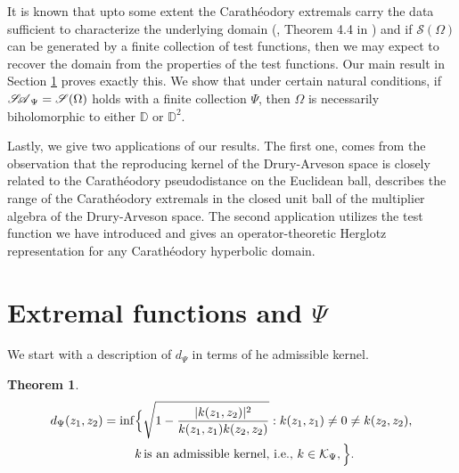 \documentclass[12pt]{amsart}
\newtheorem{theorem}{Theorem}[section]
\theoremstyle{definition}
\numberwithin{equation}{section}
\newcommand{\D}{\mathbb{D}}
\newcommand{\SA}{\mathscr{S\mspace{-5mu}A}}
\begin{document}
It is known that upto some extent the Carath\'eodory extremals carry the data sufficient to characterize the underlying domain (\cite{AglLykYouCharac}, Theorem 4.4 in \cite{KosinZwoExt}) and if $\mathscr{S}(\Omega)$ can be generated by a finite collection of test functions, then we may expect to recover the domain from the properties of the test functions. Our main result in Section \ref{FinitenessOf} proves exactly this. We show that under certain natural conditions, if $\SA_\Psi=\mathscr{S}(\Omega)$ holds with a finite collection $\Psi$, then $\Omega$ is necessarily biholomorphic to either $\D$ or $\D^2$.

Lastly, we give two applications of our results. The first one, comes from the observation that the reproducing kernel of the Drury-Arveson space is closely related to the Carath\'eodory pseudodistance on the Euclidean ball, describes the range of the Carath\'eodory extremals in the closed unit ball of the multiplier algebra of the Drury-Arveson space. The second application utilizes the test function we have introduced and gives an operator-theoretic Herglotz representation for any Carath\'eodory hyperbolic domain.
\section{Extremal functions and $\Psi$}\label{FinitenessOf}
We start with a description of $d_\Psi$ in terms of he admissible kernel.

\begin{theorem}
	\begin{align}\label{d_in_terms_of_adm_kernels}
		d_\Psi (z_1,z_2)=\inf& \Big\{\sqrt{1-\frac{|k(z_1, z_2)|^2}{k(z_1,z_1)k(z_2,z_2)}}: k(z_1,z_1)\neq 0\neq k(z_2,z_2),\\
		& k\,\text{is an admissible kernel, i.e., }k\in \mathcal{K}_\Psi, \Big\}.\notag
	\end{align}
\end{theorem}
\end{document}
